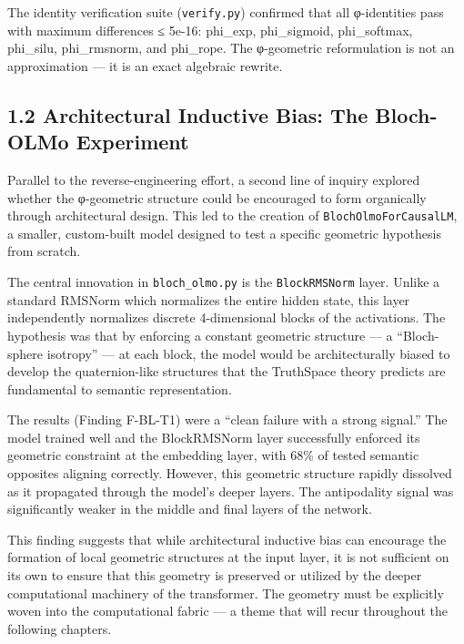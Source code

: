 \documentclass[
  twocolumn,
  10pt,
  a4paper]{article}
\begin{document}
The identity verification suite (\texttt{verify.py}) confirmed that all
φ-identities pass with maximum differences ≤ 5e-16: phi\_exp,
phi\_sigmoid, phi\_softmax, phi\_silu, phi\_rmsnorm, and phi\_rope. The
φ-geometric reformulation is not an approximation --- it is an exact
algebraic rewrite.

\hypertarget{architectural-inductive-bias-the-bloch-olmo-experiment}{%
\subsection{1.2 Architectural Inductive Bias: The Bloch-OLMo
Experiment}\label{architectural-inductive-bias-the-bloch-olmo-experiment}}

Parallel to the reverse-engineering effort, a second line of inquiry
explored whether the φ-geometric structure could be encouraged to form
organically through architectural design. This led to the creation of
\texttt{BlochOlmoForCausalLM}, a smaller, custom-built model designed to
test a specific geometric hypothesis from scratch.

The central innovation in \texttt{bloch\_olmo.py} is the
\texttt{BlockRMSNorm} layer. Unlike a standard RMSNorm which normalizes
the entire hidden state, this layer independently normalizes discrete
4-dimensional blocks of the activations. The hypothesis was that by
enforcing a constant geometric structure --- a ``Bloch-sphere isotropy''
--- at each block, the model would be architecturally biased to develop
the quaternion-like structures that the TruthSpace theory predicts are
fundamental to semantic representation.

The results (Finding F-BL-T1) were a ``clean failure with a strong
signal.'' The model trained well and the BlockRMSNorm layer successfully
enforced its geometric constraint at the embedding layer, with 68\% of
tested semantic opposites aligning correctly. However, this geometric
structure rapidly dissolved as it propagated through the model's deeper
layers. The antipodality signal was significantly weaker in the middle
and final layers of the network.

This finding suggests that while architectural inductive bias can
encourage the formation of local geometric structures at the input
layer, it is not sufficient on its own to ensure that this geometry is
preserved or utilized by the deeper computational machinery of the
transformer. The geometry must be explicitly woven into the
computational fabric --- a theme that will recur throughout the
following chapters.
\end{document}
